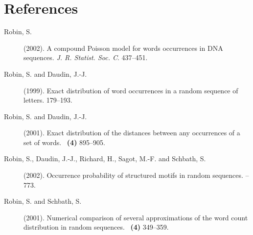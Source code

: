 \documentclass[11pt,a4paper,french]{article}
\begin{document}
\section*{References}
\begin{description}
\item[{\sc Robin, S.}]  \newblock (2002).  \newblock A compound
  {P}oisson model for words occurrences in {DNA} sequences.  \newblock
  {\em J. R. Statist. Soc. C}.   437--451.
  
\item[{\sc Robin, S.} \textnormal{and} {\sc Daudin, J.-J.}]  \newblock
  (1999).  \newblock Exact distribution of word occurrences in a
  random sequence of letters.  
   179--193.

\item[{\sc Robin, S.} \textnormal{and} {\sc Daudin, J.-J.}]  \newblock
  (2001).  \newblock Exact distribution of the distances between any
  occurrences of a set of words.    ~{\bf (4)} 895--905.

\item[{\sc Robin, S.}, {\sc Daudin, J.-J.}, {\sc Richard, H.}, {\sc
    Sagot, M.-F.} \textnormal{and} {\sc Schbath, S.}]  \newblock
  (2002).  \newblock Occurrence probability of structured motifs in
  random sequences.    --773.

\item[{\sc Robin, S.} \textnormal{and} {\sc Schbath, S.}]  \newblock
  (2001).  \newblock Numerical comparison of several approximations of
  the word count distribution in random sequences.    ~{\bf (4)} 349--359.

\end{description}

\end{document}
